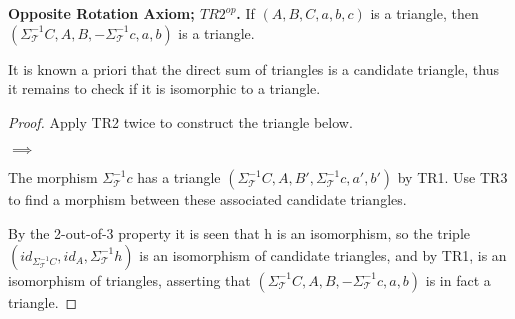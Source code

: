     \begin{lemma} \textbf{Opposite Rotation Axiom; $TR2^{op}$.}
        If $(A,B,C,a,b,c)$ is a triangle, then $(\Sigma_{\mathcal{T}}^{-1}C,A,B,-\Sigma_{\mathcal{T}}^{-1}c,a,b)$ is a triangle.
    \end{lemma}

    \begin{remark}
        It is known a priori that the direct sum of triangles is a candidate triangle, thus it remains to check if it is isomorphic to a triangle.
    \end{remark}

    \begin{proof}
        Apply TR2 twice to construct the triangle below.
        \begin{center}
            $\implies$
        \end{center}
        The morphism $\Sigma_{\mathcal{T}}^{-1}c$ has a triangle $(\Sigma_{\mathcal{T}}^{-1}C,A,B',\Sigma_{\mathcal{T}}^{-1}c,a',b')$ by TR1. Use TR3 to find a morphism between these associated candidate triangles.
        \begin{center}
        \end{center}
        By the 2-out-of-3 property it is seen that h is an isomorphism, so the triple $(id_{\Sigma_{\mathcal{T}}^{-1}C}, id_A, \Sigma_{\mathcal{T}}^{-1}h)$ is an isomorphism of candidate triangles, and by TR1, is an isomorphism of triangles, asserting that $(\Sigma_{\mathcal{T}}^{-1}C,A,B,-\Sigma_{\mathcal{T}}^{-1}c,a,b)$ is in fact a triangle.
    \end{proof}

